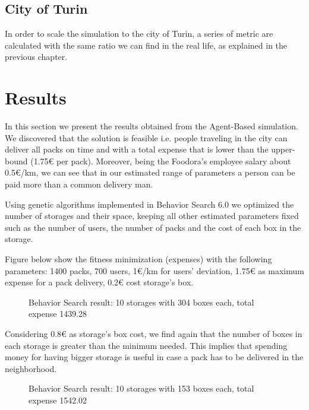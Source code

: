 \documentclass[11pt,a4paper]{article}
\begin{document}
\subsection{City of Turin}
In order to scale the simulation to the city of Turin, a series of metric are calculated with the same ratio we can find in the real life, as explained in the previous chapter.

\begin{figure}[h!]
\centering
\end{figure}

\newpage
\section{Results}
In this section we present the results obtained from the Agent-Based simulation. We discovered that the solution is feasible i.e. people traveling in the city can deliver all packs on time and with a total expense that is lower than the upper-bound (1.75\euro{} per pack). Moreover, being the Foodora's employee salary about 0.5\euro{}/km, we can see that in our estimated range of parameters a person can be paid more than a common delivery man.

Using genetic algorithms implemented in Behavior Search 6.0 we optimized the number of storages and their space, keeping all other estimated parameters fixed such as the number of users, the number of packs and the cost of each box in the storage. 

Figure below show the fitness minimization (expenses) with the following parameters: 1400 packs, 700 users, 1\euro{}/km for users' deviation, 1.75\euro{} as maximum expense for a pack delivery, 0.2\euro{} cost storage's box.

\begin{figure}[h!]
\centering
\caption{Behavior Search result: 10 storages with 304 boxes each, total expense 1439.28}
\end{figure}

Considering 0.8\euro{} as storage's box cost, we find again that the number of boxes in each storage is greater than the minimum needed. This implies that spending money for having bigger storage is useful in case a pack has to be delivered in the neighborhood.

\begin{figure}[h!]
\centering
\caption{Behavior Search result: 10 storages with 153 boxes each, total expense 1542.02}
\end{figure}
\end{document}
